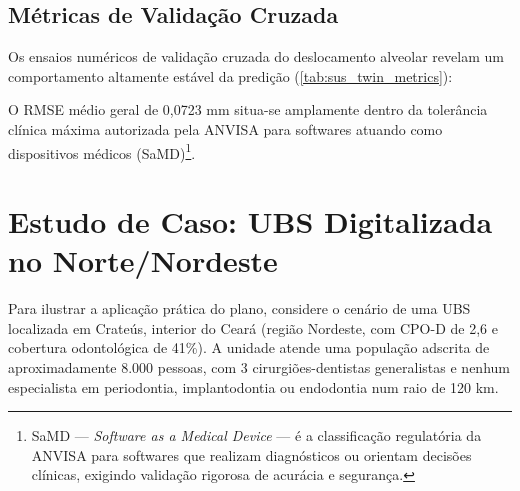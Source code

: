 \subsection{Métricas de Validação Cruzada}

Os ensaios numéricos de validação cruzada do deslocamento alveolar
revelam um comportamento altamente estável da predição
(\autoref{tab:sus_twin_metrics}):

\begin{table}[htbp]
    \centering
    \caption{Métricas de validação cruzada (K-Fold) do solucionador
             mecânico do SUS-Twin.}
    \label{tab:sus_twin_metrics}
\end{table}

O RMSE médio geral de 0,0723 mm situa-se amplamente dentro da
tolerância clínica máxima autorizada pela ANVISA para softwares
atuando como dispositivos médicos (SaMD)\footnote{SaMD — \textit{Software
as a Medical Device} — é a classificação regulatória da ANVISA para
softwares que realizam diagnósticos ou orientam decisões clínicas,
exigindo validação rigorosa de acurácia e segurança.}.

\section{Estudo de Caso: UBS Digitalizada no Norte/Nordeste}
\label{sec:estudo-caso}

Para ilustrar a aplicação prática do plano, considere o cenário de uma
UBS localizada em Crateús, interior do Ceará (região Nordeste, com
CPO-D de 2,6 e cobertura odontológica de 41\%). A unidade atende uma
população adscrita de aproximadamente 8.000 pessoas, com 3
cirurgiões-dentistas generalistas e nenhum especialista em
periodontia, implantodontia ou endodontia num raio de 120 km.

